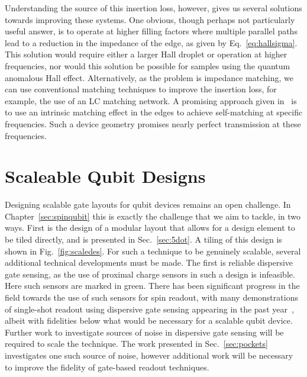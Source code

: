 Understanding the source of this insertion loss, however, gives us several solutions towards improving these systems. One obvious, though perhaps
not particularly useful answer, is to operate at higher filling factors where multiple parallel paths lead to a reduction in the impedance of the edge, as
given by Eq.~\ref{eq:hallsigma}. This solution would require either a larger Hall droplet or operation at higher frequencies, nor would this solution
be possible for samples using the quantum anomalous Hall effect. Alternatively, as the problem is impedance matching, we can use conventional matching
techniques to improve the insertion loss, for example, the use of an LC matching network. A promising approach given in~\cite{bosco2016self} is to use
an intrinsic matching effect in the edges to achieve self-matching at specific frequencies. Such a device geometry promises nearly perfect transmission at these
frequencies.

\section{Scaleable Qubit Designs}
Designing scalable gate layouts for qubit devices remains an open challenge. In Chapter~\ref{sec:spinqubit} this is exactly the challenge that we aim to
tackle, in two ways. First is the design of a modular layout that allows for a design element to be tiled directly, and is presented in Sec.~\ref{sec:5dot}.
A tiling of this design is shown in Fig.~\ref{fig:scaledes}. For such a technique to be genuinely scalable, several additional technical developments
must be made. The first is reliable dispersive gate sensing, as the use of proximal charge sensors in such a design is infeasible. Here such sensors are marked in green.
There has been significant progress in the field towards the use of such sensors for spin readout, with many demonstrations of single-shot readout using dispersive
gate sensing appearing in the past year~\cite{Nnano_dzurak,PhysRevApplied.11.044061}, albeit with fidelities below what would be necessary for a scalable qubit
device. Further work to investigate sources of noise in dispersive gate sensing will be required to scale the technique. The work presented in Sec.~\ref{sec:pockets}
investigates one such source of noise, however additional work will be necessary to improve the fidelity of gate-based readout techniques.

